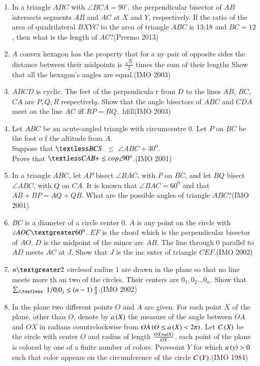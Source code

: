 \begin{enumerate}
\item In a triangle $ ABC $ with $ \angle BCA = 90^\circ $, the perpendicular bisector of $ AB $ intersects segments $ AB $ and $ AC $ at $ X $ and $ Y $, respectively. If the ratio of the area of quadrilateral $ BXYC $ to the area of triangle $ ABC $ is 13:18 and $ BC = 12 $, then what is the length of $ AC $?\hfill(Prermo 2013)
\item $A$ convex hexagon has the property that for a ny pair of opposite sides the distance between their midpoints is $\frac{\sqrt{3}}{2}$ times the sum of their lengths Show that all the hexagon's angles are equal.\hfill(IMO 2003)
\item $ABCD$ is cyclic. The feet of the perpendicula r from $D$ to the lines $AB$, $BC$, $CA$ are $P, Q,R $ respectivel$y$. Show that the angle bisectors of $ ABC$ and $CDA$ meet on the line $AC$ iff $RP = RQ$.\ hfill(IMO 2003)
\item Let $ABC$ be an acute-angled triangle with circumcentre $0$. Let $P$ on $BC$ be the foot o f the altitude from $A$. \\Suppose that $\textless BC S$ $\leq$ $\angle ABC+30^0$. \\Prove that $\textless CAB+\leq cop \angle 90^o$.\hfill(IMO 2001)
\item In a triangle $ABC$, let $AP$ bisect $\angle B AC$, with $P$ on $BC$, and let $BQ$ bisect $\angle A BC$, with $Q$ on $CA$. It is known that $\angle BAC= 60^0$ and that $AB+BP=AQ+QB$. What are the possible angles of triangle $ABC$?\hfill(IMO 2001)
\item $BC$ is a diameter of a circle center $0$. $A$ is any point on the circle with $\angle AOC \textgreater 60^0$. $EF$ is the chord which is the perpendicular bisector of $AO$. $D$ is the midpoint of the minor arc $AB$. The line through $0$ parallel to $AD$ meets $AC$ at $J$. Show that $J$ is the inc enter of triangle $CEF$.\hfill(IMO 2002)
\item $n\textgreater2$ circlesof radius $1$ are drawn in the plane so that no line meets more th an two of the circles. Their centers are $0_{1}, 0_{ 2}\dots0_{n}$. Show that $\sum_{i\textless}$ $1/0_{i }0_{j}\leq \left(n-1\right) \frac{\pi}{4}$.\hfill(IMO 2002)
\item In the plane two different points $O$ and $A$ are given.  For each point $X$ of the plane, other than $O$, denote by $a\left(X\right)$  the measure of the angle between $OA$ and $OX$ in radians countrclockwise from $OA\left(O\leq a\left(X\right)<2\pi\right)$. Let $C\left(X\right)$ be the circle  with center $O$ and radius of length $\frac {OX+a\left(X\right)}{OX}$. each  point  of the plane is colored by one of a finite number of colors. Proveoint $Y$ for which $a\left(y\right)>0$ such that color appears on  the circumference of the circle $C\left(Y\right)$.\hfill(IMO 1984)

\end{enumerate}
